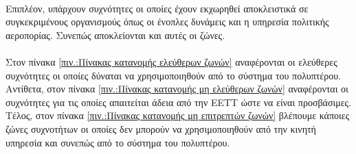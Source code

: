 \documentclass[a4paper, 12pt, twoside]{report}
\begin{document}
{{{{{{			\paragraph{}{Επιπλέον, υπάρχουν συχνότητες οι οποίες έχουν εκχωρηθεί αποκλειστικά σε συγκεκριμένους οργανισμούς όπως οι ένοπλες δυνάμεις και η υπηρεσία πολιτικής αεροπορίας. Συνεπώς αποκλείονται και αυτές οι ζώνες.
			}
			
			\paragraph{}{Στον πίνακα \ref{πιν.:Πίνακας κατανομής ελεύθερων ζωνών} αναφέρονται οι ελεύθερες συχνότητες οι οποίες δύναται να χρησιμοποιηθούν από το σύστημα του πολυπτέρου. Αντίθετα, στον πίνακα \ref{πιν.:Πίνακας κατανομής μη ελεύθερων ζωνών} αναφέρονται οι συχνότητες για τις οποίες απαιτείται άδεια από την ΕΕΤΤ ώστε να είναι προσβάσιμες. Τέλος, στον πίνακα \ref{πιν.:Πίνακας κατανομής μη επιτρεπτών ζωνών} βλέπουμε κάποιες ζώνες συχνοτήτων οι οποίες δεν μπορούν να χρησιμοποιηθούν από την κινητή υπηρεσία και συνεπώς από το σύστημα του πολυπτέρου.
			}
			
			\begin{landscape}	
			\setlength\LTleft{0pt}            %
			\setlength\LTright{0pt}           %
			

\end{landscape}}}}}}}
\end{document}
